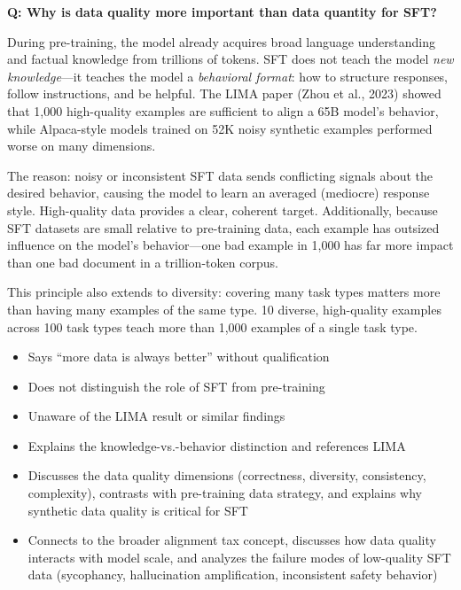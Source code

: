 \bigskip

\begin{interviewq}
\textbf{Q: Why is data quality more important than data quantity for SFT?}

 \quad {} \quad \badgefreq{\freqmed}

\stronganswer
During pre-training, the model already acquires broad language understanding and
factual knowledge from trillions of tokens.  SFT does not teach the model
\emph{new knowledge}---it teaches the model a \emph{behavioral format}: how to
structure responses, follow instructions, and be helpful.  The LIMA paper (Zhou
et al., 2023) showed that 1,000 high-quality examples are sufficient to align a
65B model's behavior, while Alpaca-style models trained on 52K noisy synthetic
examples performed worse on many dimensions.

The reason: noisy or inconsistent SFT data sends conflicting signals about the
desired behavior, causing the model to learn an averaged (mediocre) response
style.  High-quality data provides a clear, coherent target.  Additionally,
because SFT datasets are small relative to pre-training data, each example has
outsized influence on the model's behavior---one bad example in 1,000 has far
more impact than one bad document in a trillion-token corpus.

This principle also extends to diversity: covering many task types matters more
than having many examples of the same type.  10 diverse, high-quality examples
across 100 task types teach more than 1,000 examples of a single task type.

\redflags
\begin{itemize}
    \item Says ``more data is always better'' without qualification
    \item Does not distinguish the role of SFT from pre-training
    \item Unaware of the LIMA result or similar findings
\end{itemize}


\goodgreat
\begin{itemize}
    \item {} Explains the knowledge-vs.-behavior distinction and
          references LIMA
    \item {} Discusses the data quality dimensions (correctness, diversity,
          consistency, complexity), contrasts with pre-training data strategy, and
          explains why synthetic data quality is critical for SFT
    \item {} Connects to the broader alignment tax concept, discusses
          how data quality interacts with model scale, and analyzes the failure modes
          of low-quality SFT data (sycophancy, hallucination amplification,
          inconsistent safety behavior)
\end{itemize}


\end{interviewq}
